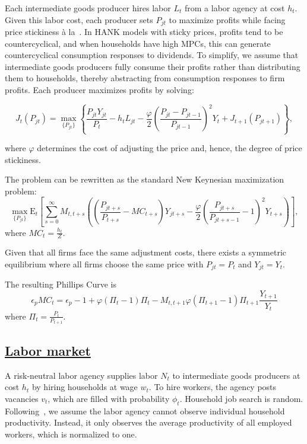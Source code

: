 \documentclass[qe,draft]{econsocart}
\theoremstyle{plain}
\theoremstyle{definition}
\begin{document}
Each intermediate goods producer hires labor \( L_t \) from a labor agency at cost \( h_t \). Given this labor cost, each producer sets \( P_{jt} \) to maximize profits while facing price stickiness à la~\cite{Rotemberg1982}. In HANK models with sticky prices, profits tend to be countercyclical, and when households have high MPCs, this can generate countercyclical consumption responses to dividends. To simplify, we assume that intermediate goods producers fully consume their profits rather than distributing them to households, thereby abstracting from consumption responses to firm profits. Each producer maximizes profits by solving:

\[
  J_{t}\left(P_{jt}\right) = \max_{\{P_{jt}\}} \left\{\frac{P_{jt}Y_{jt}}{P_{t}} - h_{t} L_{jt} -  \frac{\varphi}{2}{\left( \frac{P_{jt} - P_{jt-1}}{P_{jt-1}} \right)}^{2} Y_{t}  + J_{t+1}\left(P_{jt+1}\right) \right\},
\]

where $\varphi$ determines the cost of adjusting the price and, hence, the degree of price stickiness.

The problem can be rewritten as the standard New Keynesian maximization problem:
\[
  \max_{\{P_{jt}\}} \mathrm{E}_{t}\left[\sum_{s=0}^{\infty}  M_{t,t+s} \left( \left( \frac{P_{jt+s}}{P_{t+s}} - MC_{t+s}\right)Y_{jt+s} -  \frac{\varphi}{2}{\left( \frac{P_{jt+s}}{P_{jt+s-1}} - 1\right)}^{2} Y_{t+s} \right)\right],
\]
where $MC_{t} = \frac{h_{t}}{Z}$.

Given that all firms face the same adjustment costs, there exists a symmetric equilibrium where all firms choose the same price with $P_{jt}=P_{t}$ and $Y_{jt}=Y_{t}$.

The resulting Phillips Curve is
\[
  \epsilon_{p} MC_{t} = \epsilon_{p} - 1 + \varphi ( \Pi_{t} -1) \Pi_{t} - M_{t,t+1} \varphi (\Pi_{t+1} -1 ) \Pi_{t+1} \frac{Y_{t+1}}{Y_{t}}
\]
where $\Pi_{t} = \frac{P_{t}}{P_{t+1}}$.

\subsection{\href{https://econ-ark.github.io/HAFiscal/\#sec:hank-labor-market}{Labor market}}\label{sec:hank-labor-market}

A risk-neutral labor agency supplies labor \( N_t \) to intermediate goods producers at cost \( h_t \) by hiring households at wage \( w_t \). To hire workers, the agency posts vacancies \( v_t \), which are filled with probability \( \phi_t \). Household job search is random. Following~\cite{Bardoczy2021}, we assume the labor agency cannot observe individual household productivity. Instead, it only observes the average productivity of all employed workers, which is normalized to one.
\end{document}
